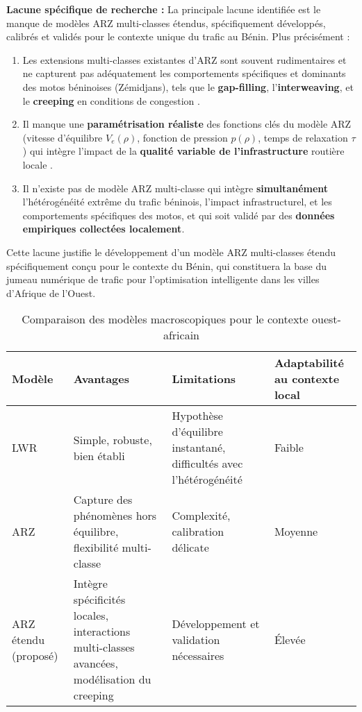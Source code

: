 \textbf{Lacune spécifique de recherche :} La principale lacune identifiée est le manque de modèles ARZ multi-classes étendus, spécifiquement développés, calibrés et validés pour le contexte unique du trafic au Bénin. Plus précisément :

\begin{enumerate}
    \item Les extensions multi-classes existantes d'ARZ sont souvent rudimentaires et ne capturent pas adéquatement les comportements spécifiques et dominants des motos béninoises (Zémidjans), tels que le \textbf{gap-filling}, l'\textbf{interweaving}, et le \textbf{creeping} en conditions de congestion \cite{Saumtally2012}.
    \item Il manque une \textbf{paramétrisation réaliste} des fonctions clés du modèle ARZ (vitesse d'équilibre $V_e(\rho)$, fonction de pression $p(\rho)$, temps de relaxation $\tau$) qui intègre l'impact de la \textbf{qualité variable de l'infrastructure} routière locale \cite{JollyEtAl2005}.
    \item Il n'existe pas de modèle ARZ multi-classe qui intègre \textbf{simultanément} l'hétérogénéité extrême du trafic béninois, l'impact infrastructurel, et les comportements spécifiques des motos, et qui soit validé par des \textbf{données empiriques collectées localement}.
\end{enumerate}

Cette lacune justifie le développement d'un modèle ARZ multi-classes étendu spécifiquement conçu pour le contexte du Bénin, qui constituera la base du jumeau numérique de trafic pour l'optimisation intelligente dans les villes d'Afrique de l'Ouest.

\begin{table}[htbp]
\centering
\caption{Comparaison des modèles macroscopiques pour le contexte ouest-africain}
\label{tab:modeles_comparaison}
\begin{tabular}{|p{3cm}|p{4cm}|p{4cm}|p{3cm}|}
\hline
\textbf{Modèle} & \textbf{Avantages} & \textbf{Limitations} & \textbf{Adaptabilité au contexte local} \\
\hline
LWR & Simple, robuste, bien établi & Hypothèse d'équilibre instantané, difficultés avec l'hétérogénéité & Faible \\
\hline
ARZ & Capture des phénomènes hors équilibre, flexibilité multi-classe & Complexité, calibration délicate & Moyenne \\
\hline
ARZ étendu (proposé) & Intègre spécificités locales, interactions multi-classes avancées, modélisation du creeping & Développement et validation nécessaires & Élevée \\
\hline
\end{tabular}
\end{table}